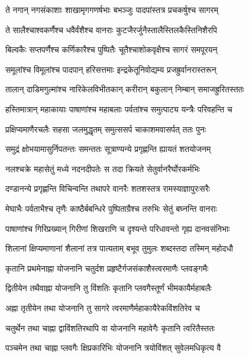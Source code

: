 \twolineshloka
{ते नगान् नगसंकाशाः शाखामृगगणर्षभाः}
{बभञ्जुः पादपांस्तत्र प्रचकर्षुश्च सागरम्} %

\twolineshloka
{ते सालैश्चाश्वकर्णैश्च धवैर्वंशैश्च वानराः}
{कुटजैरर्जुनैस्तालैस्तिलकैस्तिनिशैरपि} %

\twolineshloka
{बिल्वकैः सप्तपर्णैश्च कर्णिकारैश्च पुष्पितैः}
{चूतैश्चाशोकवृक्षैश्च सागरं समपूरयन्} %

\twolineshloka
{समूलांश्च विमूलांश्च पादपान् हरिसत्तमाः}
{इन्द्रकेतूनिवोद्यम्य प्रजह्रुर्वानरास्तरून्} %

\twolineshloka
{तालान् दाडिमगुल्मांश्च नारिकेलविभीतकान्}
{करीरान् बकुलान् निम्बान् समाजह्रुरितस्ततः} %

\twolineshloka
{हस्तिमात्रान् महाकायाः पाषाणांश्च महाबलाः}
{पर्वतांश्च समुत्पाट्य यन्त्रैः परिवहन्ति च} %

\twolineshloka
{प्रक्षिप्यमाणैरचलैः सहसा जलमुद्धृतम्}
{समुत्ससर्प चाकाशमवासर्पत् ततः पुनः} %

\twolineshloka
{समुद्रं क्षोभयामासुर्निपतन्तः समन्ततः}
{सूत्राण्यन्ये प्रगृह्णन्ति ह्यायतं शतयोजनम्} %

\twolineshloka
{नलश्चक्रे महासेतुं मध्ये नदनदीपतेः}
{स तदा क्रियते सेतुर्वानरैर्घोरकर्मभिः} %

\twolineshloka
{दण्डानन्ये प्रगृह्णन्ति विचिन्वन्ति तथापरे}
{वानरैः शतशस्तत्र रामस्याज्ञापुरःसरैः} %

\twolineshloka
{मेघाभैः पर्वताभैश्च तृणैः काष्ठैर्बबन्धिरे}
{पुष्पिताग्रैश्च तरुभिः सेतुं बघ्नन्ति वानराः} %

\twolineshloka
{पाषाणांश्च गिरिप्रख्यान् गिरीणां शिखराणि च}
{दृश्यन्ते परिधावन्तो गृह्य दानवसंनिभाः} %

\twolineshloka
{शिलानां क्षिप्यमाणानां शैलानां तत्र पात्यताम्}
{बभूव तुमुलः शब्दस्तदा तस्मिन् महोदधौ} %

\twolineshloka
{कृतानि प्रथमेनाह्ना योजनानि चतुर्दश}
{प्रहृष्टैर्गजसंकाशैस्त्वरमाणैः प्लवङ्गमैः} %

\twolineshloka
{द्वितीयेन तथैवाह्ना योजनानि तु विंशतिः}
{कृतानि प्लवगैस्तूर्णं भीमकायैर्महाबलैः} %

\twolineshloka
{अह्ना तृतीयेन तथा योजनानि तु सागरे}
{त्वरमाणैर्महाकायैरेकविंशतिरेव च} %

\twolineshloka
{चतुर्थेन तथा चाह्ना द्वाविंशतिरथापि वा}
{योजनानि महावेगैः कृतानि त्वरितैस्ततः} %

\twolineshloka
{पञ्चमेन तथा चाह्ना प्लवगैः क्षिप्रकारिभिः}
{योजनानि त्रयोविंशत् सुवेलमधिकृत्य वै} %

